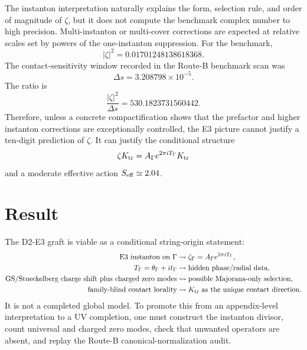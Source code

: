 \documentclass[11pt]{article}
\begin{document}
The instanton interpretation naturally explains the form, selection rule, and
order of magnitude of \(\zeta\), but it does not compute the benchmark complex
number to high precision.  Multi-instanton or multi-cover corrections are
expected at relative scales set by powers of the one-instanton suppression.
For the benchmark,
\begin{equation}
  |\zeta|^2=0.01701248138618368.
\end{equation}
The contact-sensitivity window recorded in the Route-B benchmark scan was
\begin{equation}
  \Delta s=3.208798\times10^{-5}.
\end{equation}
The ratio is
\begin{equation}
  \frac{|\zeta|^2}{\Delta s}=530.1823731560442.
\end{equation}
Therefore, unless a concrete compactification shows that the prefactor and
higher instanton corrections are exceptionally controlled, the E3 picture
cannot justify a ten-digit prediction of \(\zeta\).  It can justify the
conditional structure
\begin{equation}
  \zeta K_{\rm tr}
  =
  A_\Gamma e^{2\pi iT_\Gamma}K_{\rm tr}
\end{equation}
and a moderate effective action \(S_{\rm eff}\simeq2.04\).

\section{Result}

The D2-E3 graft is viable as a conditional string-origin statement:
\begin{align}
  \text{E3 instanton on }\Gamma
  &\leadsto
  \zeta_\Gamma=A_\Gamma e^{2\pi iT_\Gamma},\\
  T_\Gamma=\theta_\Gamma+i t_\Gamma
  &\leadsto
  \text{hidden phase/radial data},\\
  \text{GS/Stueckelberg charge shift plus charged zero modes}
  &\leadsto
  \text{possible Majorana-only selection},\\
  \text{family-blind contact locality}
  &\leadsto
  K_{\rm tr}\text{ as the unique contact direction}.
\end{align}
It is not a completed global model.  To promote this from an appendix-level
interpretation to a UV completion, one must construct the instanton divisor,
count universal and charged zero modes, check that unwanted operators are
absent, and replay the Route-B canonical-normalization audit.
\end{document}
